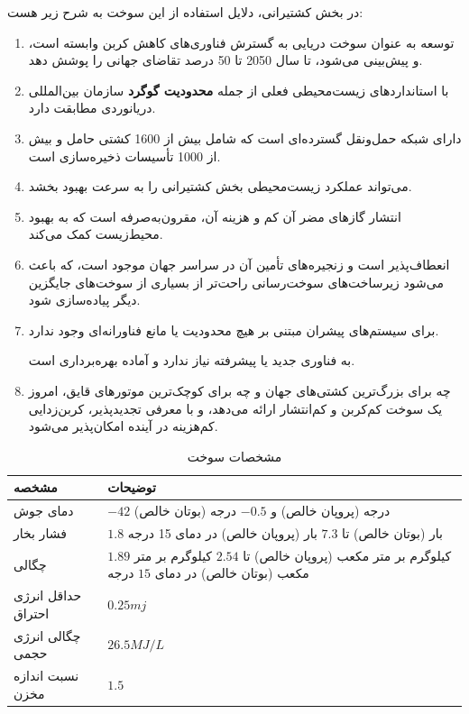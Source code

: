 در بخش کشتیرانی،
دلایل استفاده از این سوخت به شرح زیر هست:
\begin{enumerate}
	\item 
	توسعه 
	 به عنوان سوخت دریایی به گسترش فناوری‌های کاهش کربن وابسته است، و پیش‌بینی می‌شود،
	  تا سال 2050 تا 50 درصد تقاضای جهانی را پوشش دهد.
	\item 
	 با استانداردهای زیست‌محیطی فعلی از جمله \textbf{محدودیت گوگرد} سازمان بین‌المللی دریانوردی 
	  مطابقت دارد.
	\item 
	دارای شبکه حمل‌ونقل گسترده‌ای است که شامل بیش از 1600 کشتی حامل 
	 و بیش از 1000 تأسیسات ذخیره‌سازی است.
	\item  
	می‌تواند عملکرد زیست‌محیطی بخش کشتیرانی را به سرعت بهبود بخشد.
	\item 
	انتشار گازهای مضر آن کم و هزینه آن، مقرون‌به‌صرفه است که به بهبود محیط‌زیست کمک می‌کند.
	\item 
	 انعطاف‌پذیر است و زنجیره‌های تأمین آن در سراسر جهان موجود است، که باعث می‌شود زیرساخت‌های سوخت‌رسانی راحت‌تر از بسیاری از سوخت‌های جایگزین دیگر پیاده‌سازی شود.
	 \item 
	 برای سیستم‌های پیشران مبتنی بر
هیچ محدودیت یا مانع فناورانه‌ای وجود ندارد.
	
	  به فناوری جدید یا پیشرفته نیاز ندارد و آماده بهره‌برداری است.
	 \item 
	 چه برای بزرگ‌ترین کشتی‌های جهان و چه برای کوچک‌ترین موتورهای قایق،
	  امروز یک سوخت کم‌کربن و کم‌انتشار ارائه می‌دهد، و با معرفی 
	  تجدیدپذیر، کربن‌زدایی کم‌هزینه در آینده امکان‌پذیر می‌شود.
\end{enumerate}
	 
\newpage

\begin{table}[h!]
	\centering
	\caption{مشخصات سوخت }
	\label{dsd}
	\begin{tabular}{|m{2cm}|m{12cm}|}
		\hline
		\textbf{مشخصه} & \textbf{توضیحات} \\
		\hline
		دمای جوش   & $-42$ درجه (پروپان خالص) و $-0.5$ درجه (بوتان خالص) \\
		فشار بخار & $1.8$ بار (بوتان خالص) تا $7.3$ بار (پروپان خالص) در دمای 15 درجه\\
		 چگالی & $1.89$ کیلوگرم بر متر مکعب (پروپان خالص) تا $2.54$ کیلوگرم بر متر مکعب (بوتان خالص) در دمای $15$ ‌درجه \\
		حداقل انرژی احتراق & $ 0.25 mj$\\
		چگالی انرژی حجمی &  $  26.5MJ/L $   \\
		نسبت اندازه مخزن & $1.5$  \\
		\hline
	\end{tabular}
\end{table}

